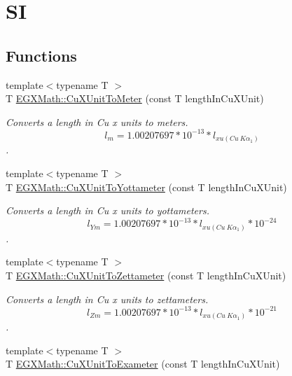\hypertarget{group___e_g_x_math-_conversions-_length_conversions-_non-_s_i-_cu_x_unit-_s_i}{}\section{SI}
\label{group___e_g_x_math-_conversions-_length_conversions-_non-_s_i-_cu_x_unit-_s_i}
\subsection*{Functions}
\begin{DoxyCompactItemize}
\item 
{\footnotesize template$<$typename T $>$ }\\T \mbox{\hyperlink{group___e_g_x_math-_conversions-_length_conversions-_non-_s_i-_cu_x_unit-_s_i_ga2879f79428ad854a11b3309d893ef9f7}{E\+G\+X\+Math\+::\+Cu\+X\+Unit\+To\+Meter}} (const T length\+In\+Cu\+X\+Unit)
\begin{DoxyCompactList}\small\item\em Converts a length in Cu x units to meters. \[ l_{m}=1.00207697*10^{-13} * l_{xu(Cu\ K\alpha_1)} \]. \end{DoxyCompactList}\item 
{\footnotesize template$<$typename T $>$ }\\T \mbox{\hyperlink{group___e_g_x_math-_conversions-_length_conversions-_non-_s_i-_cu_x_unit-_s_i_ga0bd6ee075a560568ab46fd396a6e0b19}{E\+G\+X\+Math\+::\+Cu\+X\+Unit\+To\+Yottameter}} (const T length\+In\+Cu\+X\+Unit)
\begin{DoxyCompactList}\small\item\em Converts a length in Cu x units to yottameters. \[ l_{Ym}=1.00207697*10^{-13} * l_{xu(Cu\ K\alpha_1)} * 10^{-24} \]. \end{DoxyCompactList}\item 
{\footnotesize template$<$typename T $>$ }\\T \mbox{\hyperlink{group___e_g_x_math-_conversions-_length_conversions-_non-_s_i-_cu_x_unit-_s_i_ga1c95837914c023ff53343f87b76ac330}{E\+G\+X\+Math\+::\+Cu\+X\+Unit\+To\+Zettameter}} (const T length\+In\+Cu\+X\+Unit)
\begin{DoxyCompactList}\small\item\em Converts a length in Cu x units to zettameters. \[ l_{Zm}=1.00207697*10^{-13} * l_{xu(Cu\ K\alpha_1)} * 10^{-21} \]. \end{DoxyCompactList}\item 
{\footnotesize template$<$typename T $>$ }\\T \mbox{\hyperlink{group___e_g_x_math-_conversions-_length_conversions-_non-_s_i-_cu_x_unit-_s_i_ga316cae582cd83563ed7235488958606d}{E\+G\+X\+Math\+::\+Cu\+X\+Unit\+To\+Exameter}} (const T length\+In\+Cu\+X\+Unit)

\end{DoxyCompactItemize}
